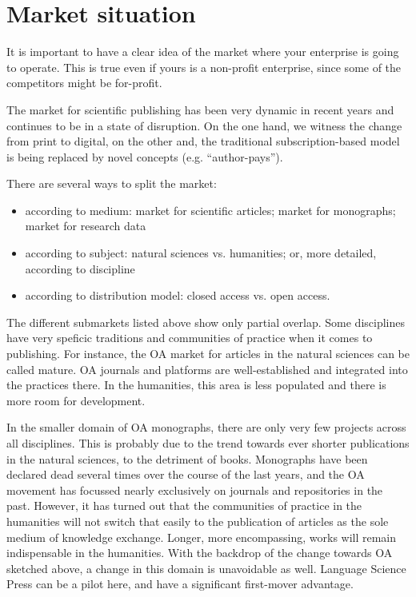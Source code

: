 \documentclass[nonflat,smallfont
]{langsci/langscibook}
\newcommand{\background}[1]{ 
  \vspace{5mm}
  \renewcommand{\tblslinecolour}{lsDarkBlue}
  \tblssy[red]{explore2}{Background}{\vspace*{-5mm}#1}
}
\newcommand{\langscisolution}[1]{
  \renewcommand{\tblslinecolour}{lsLightBlue}
  \tblssy{langsci}{LangSci solution}{\vspace*{-5mm}#1}
}
\renewcommand{\tblssy}[4][black!12]{%
  \renewcommand{\langscisymbol}{#2}\renewcommand{\tblsboxcolor}{#1}
  \begin{mdframed}[style=yellowexercise,frametitle={#3}]
    #4
  \end{mdframed}
}
\begin{document}
\section{Market situation}
\vspace*{5mm}\background{It is important to have a clear idea of the market where your enterprise is going to operate. This is true even if yours is a non-profit enterprise, since some of the competitors might be for-profit. }
\largerpage
\langscisolution{ 
The market for scientific publishing has been very dynamic in recent years and continues to be in a state of disruption. On the one hand, we witness the change from print to digital, on the other and, the traditional subscription-based model is being replaced by novel concepts (e.g. ``author-pays''). 

There are several ways to split the market: 
\begin{itemize}
\sloppy
 \item according to medium: market for scientific articles; market for monographs; market for research data
 \item according to subject: natural sciences vs. humanities; or, more detailed, according to discipline
 \item according to distribution model: closed access vs. open access.
\end{itemize}
 
The different submarkets listed above show only partial overlap. Some disciplines have very speficic traditions and communities of practice when it comes to publishing. For instance, the OA market for articles in the natural sciences can be called mature. OA journals and platforms are well-established and integrated into the practices there. In the humanities, this area is less populated and there is more room for development.

In the smaller domain of OA monographs, there are only very few projects across all disciplines. This is probably due to the trend towards ever shorter publications in the natural sciences, to the detriment of books. Monographs have been declared dead several times over the course of the last years, and the OA movement has focussed nearly exclusively on journals and repositories in the past. However, it has turned out that the communities of practice in the humanities will not switch that easily to the publication of articles as the sole medium of knowledge exchange. Longer, more encompassing, works will remain indispensable in the humanities. With the backdrop of the change towards OA sketched above, a change in this domain is unavoidable as well. Language Science Press can be a pilot here, and have a significant first-mover advantage. 
}
\end{document}
